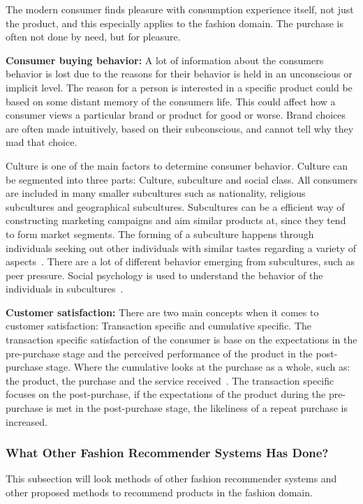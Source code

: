 The modern consumer finds pleasure with consumption experience itself, not just the product, and this especially applies to the fashion domain.
The purchase is often not done by need, but for pleasure.

\textbf{Consumer buying behavior:}
A lot of information about the consumers behavior is lost due to the reasons for their behavior is held in an unconscious or implicit level.
The reason for a person is interested in a specific product could be based on some distant memory of the consumers life.
This could affect how a consumer views a particular brand or product for good or worse.
Brand choices are often made intuitively, based on their subconscious, and cannot tell why they mad that choice.

Culture is one of the main factors to determine consumer behavior.
Culture can be segmented into three parts: Culture, subculture and social class.
All consumers are included in many smaller subcultures such as nationality, religious subcultures and geographical subcultures.
Subcultures can be a efficient way of constructing marketing campaigns and aim similar products at, since they tend to form market segments.
The forming of a subculture happens through individuals seeking out other individuals with similar tastes regarding a variety of aspects~\cite{vignali2009fashion}.
There are a lot of different behavior emerging from subcultures, such as peer pressure.
Social psychology is used to understand the behavior of the individuals in subcultures~\cite{vignali2009fashion}.

\textbf{Customer satisfaction:}
There are two main concepts when it comes to customer satisfaction:
Transaction specific and cumulative specific.
The transaction specific satisfaction of the consumer is base on the expectations in the pre-purchase stage and the perceived performance of the product in the post-purchase stage.
Where the cumulative looks at the purchase as a whole, such as: the product, the purchase and the service received~\cite{kumari2012}.
The transaction specific focuses on the post-purchase, if the expectations of the product during the pre-purchase is met in the post-purchase stage, the likeliness of a repeat purchase is increased.



\subsubsection{What Other Fashion Recommender Systems Has Done?}
This subsection will look methods of other fashion recommender systems and other proposed methods to recommend products in the fashion domain.

